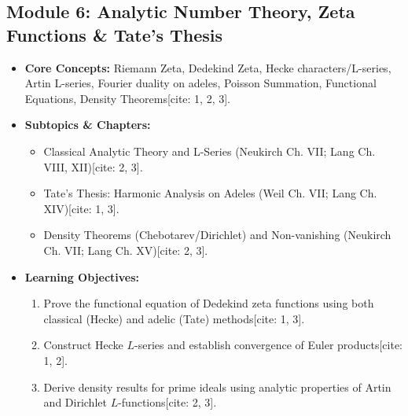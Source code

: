 \documentclass[11pt,a4paper]{article}
\begin{document}
\subsection*{Module 6: Analytic Number Theory, Zeta Functions \& Tate's Thesis}
\begin{itemize}[leftmargin=*]
    \item \textbf{Core Concepts:} Riemann Zeta, Dedekind Zeta, Hecke characters/L-series, Artin L-series, Fourier duality on adeles, Poisson Summation, Functional Equations, Density Theorems[cite: 1, 2, 3].
    \item \textbf{Subtopics \& Chapters:}
    \begin{itemize}
        \item Classical Analytic Theory and L-Series (Neukirch Ch. VII; Lang Ch. VIII, XII)[cite: 2, 3].
        \item Tate's Thesis: Harmonic Analysis on Adeles (Weil Ch. VII; Lang Ch. XIV)[cite: 1, 3].
        \item Density Theorems (Chebotarev/Dirichlet) and Non-vanishing (Neukirch Ch. VII; Lang Ch. XV)[cite: 2, 3].
    \end{itemize}
    \item \textbf{Learning Objectives:}
    \begin{enumerate}
        \item Prove the functional equation of Dedekind zeta functions using both classical (Hecke) and adelic (Tate) methods[cite: 1, 3].
        \item Construct Hecke $L$-series and establish convergence of Euler products[cite: 1, 2].
        \item Derive density results for prime ideals using analytic properties of Artin and Dirichlet $L$-functions[cite: 2, 3].
    \end{enumerate}
\end{itemize}
\end{document}
